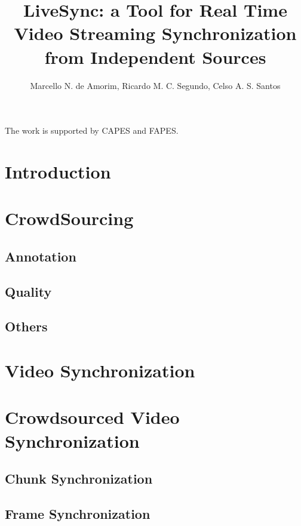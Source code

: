 \documentclass[jidm,a4paper]{jidm} %
\title{LiveSync: a Tool for Real Time Video Streaming Synchronization from Independent Sources}
\author{Marcello N. de Amorim\inst{1}, Ricardo M. C. Segundo\inst{2}, Celso A. S. Santos\inst{3}}
\institute{Universidade Federal do Espirito Santo, Brazil  \\ \email{novaes@inf.ufes.br , rmcs87@gmail.com , saibel@inf.ufes.br}
}
\begin{document}
\begin{bottomstuff}
The work is supported by CAPES and FAPES.
\end{bottomstuff}

\maketitle

\section{Introduction}


\section{CrowdSourcing}

\subsection{Annotation}


\subsection{Quality}


\subsection{Others}

\section{Video Synchronization}


\section{Crowdsourced Video Synchronization}


\subsection{Chunk Synchronization}


\subsection{Frame Synchronization}

\end{document}

